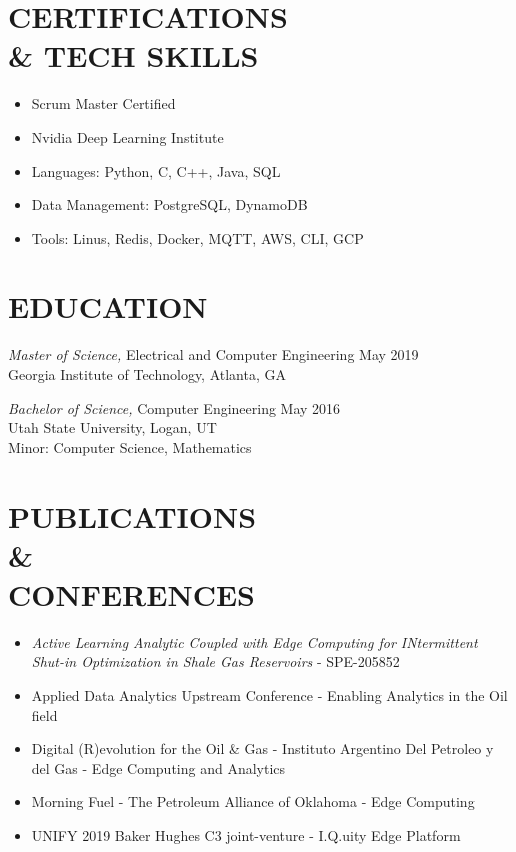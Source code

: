 \documentclass[line,margin]{res}
\begin{document}
\begin{resume}
	\section{CERTIFICATIONS\\\& TECH SKILLS}
	\begin{itemize} \itemsep -2pt
		\item Scrum Master Certified
		\item Nvidia Deep Learning Institute
		\item Languages: Python, C, C++, Java, SQL
		\item Data Management: PostgreSQL, DynamoDB
		\item Tools: Linus, Redis, Docker, MQTT, AWS, CLI, GCP
	\end{itemize}

	\section{EDUCATION}
	 {\sl Master of Science,} Electrical and Computer Engineering \hfill May 2019\\
	Georgia Institute of Technology, Atlanta, GA

		{\sl Bachelor of Science,} Computer Engineering \hfill May 2016\\
	Utah State University, Logan, UT\\
	Minor: Computer Science, Mathematics
	\section{PUBLICATIONS\\\&\\CONFERENCES}
	\begin{itemize} \itemsep -2pt
		\item {\sl Active Learning Analytic Coupled with Edge Computing for INtermittent Shut-in Optimization in Shale Gas Reservoirs} - SPE-205852
		\item Applied Data Analytics Upstream Conference - Enabling Analytics in the Oil field
		\item Digital (R)evolution for the Oil \& Gas - Instituto Argentino Del Petroleo y del Gas - Edge Computing and Analytics
		\item Morning Fuel - The Petroleum Alliance of Oklahoma - Edge Computing
		\item UNIFY 2019 Baker Hughes C3 joint-venture - I.Q.uity Edge Platform
	\end{itemize}



\end{resume}
\end{document}
